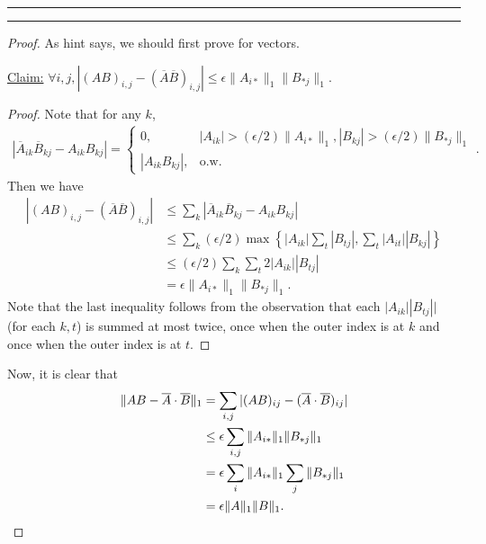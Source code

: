 \documentclass[11pt]{article}
\newcommand{\question}[1] {\vspace{.3in} \hrule\vspace{0.3em}
\noindent{\bf #1} \vspace{0.7em}
\hrule \vspace{.10in}}
\begin{document}
\newpage
\question{Task 3}
\begin{proof}
As hint says, we should first prove for vectors.

\underline{Claim:} $\forall i,j, |(AB)_{i,j} - (\overline{A}\overline{B})_{i,j}| \le \epsilon \|A_{i*}\|_1 \|B_{*j}\|_1$.
\begin{proof}
Note that for any $k$,
\begin{align*}
    |\overline{A}_{ik} \overline{B}_{kj} - A_{ik}B_{kj}| = \begin{cases}
        0, & |A_{ik}| > (\epsilon/2) \|A_{i*}\|_1, |B_{kj}| > (\epsilon/2) \|B_{*j}\|_1\\
        |A_{ik}B_{kj}|, & \text{o.w.}
    \end{cases}.
\end{align*}
Then we have
\begin{align*}
    |(AB)_{i,j} - (\overline{A}\overline{B})_{i,j}| &\le \sum_k |\overline{A}_{ik} \overline{B}_{kj} - A_{ik}B_{kj}|\\
    &\le \sum_k (\epsilon/2)\max\left\{|A_{ik}|\sum_t |B_{tj}|, \sum_t |A_{it}||B_{kj}|\right\}\\
    &\le (\epsilon/2)\sum_k \sum_t 2|A_{ik}||B_{tj}|\\
    &= \epsilon \|A_{i*}\|_1 \|B_{*j}\|_1.
\end{align*}
Note that the last inequality follows from the observation that each $|A_{ik}||B_{tj}||$ (for each $k,t$) is summed at most twice, once when the outer index is at $k$ and once when the outer index is at $t$.
\end{proof}
Now, it is clear that
\begin{align*}
\|AB - \overline{A} \cdot \overline{B}\|_1 &= \sum_{i,j} |(AB)_{ij} - (\overline{A} \cdot \overline{B})_{ij}| \\
&\le \epsilon\sum_{i,j} \|A_{i*}\|_1 \|B_{*j}\|_1\\
&= \epsilon \sum_i \|A_{i*}\|_1 \sum_j \|B_{*j}\|_1\\
&= \epsilon \|A\|_1 \|B\|_1. \qedhere
\end{align*}
\end{proof}
\end{document}
